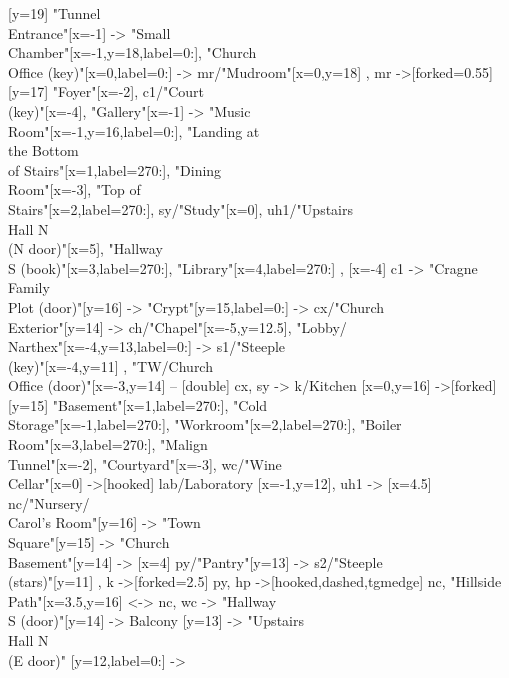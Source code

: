\documentclass[a5paper]{extarticle}
\begin{document}
\begin{adjustbox}{max size={\linewidth}{\dimexpr\textheight - 2.5em\relax},center}
\begin{gamemap}[>={Stealth[round,black]},set grid={8.5em}{5.5em}]
{  { [y=19] "Tunnel\\Entrance"[x=-1] -> "Small\\Chamber"[x=-1,y=18,label={0:\faBook}],
    "Church\\Office (key)"[x=0,label={0:\faUniversity}] -> mr/"Mudroom"[x=0,y=18] },
  mr ->[forked=0.55]
  { [y=17] "Foyer"[x=-2], c1/"Court\\(key)"[x=-4], "Gallery"[x=-1] -> "Music\\Room"[x=-1,y=16,label={0:\faUniversity}],
    "Landing at\\the Bottom\\of Stairs"[x=1,label={270:\faBook}], "Dining\\Room"[x=-3],
    "Top of\\Stairs"[x=2,label={270:\faBook}], sy/"Study"[x=0], uh1/"Upstairs\\Hall N\\(N door)"[x=5],
    "Hallway\\S (book)"[x=3,label={270:\faBook}],
    "Library"[x=4,label={270:\faBook}] },
  { [x=-4] c1 -> "Cragne Family\\Plot (door)"[y=16] -> "Crypt"[y=15,label={0:\faUniversity}] ->
    cx/"Church\\Exterior"[y=14]} ->
  { ch/"Chapel"[x=-5,y=12.5], "Lobby/\\Narthex"[x=-4,y=13,label={0:\faBook}] -> s1/"Steeple\\(key)"[x=-4,y=11] },
  "TW/Church\\Office (door)"[x=-3,y=14] -- [double] cx,
  sy -> k/Kitchen [x=0,y=16] ->[forked]
  { [y=15] "Basement"[x=1,label={270:\faBook}], "Cold\\Storage"[x=-1,label={270:\faUniversity}], "Workroom"[x=2,label={270:\faBook}], "Boiler\\Room"[x=3,label={270:\faBook}],
    "Malign\\Tunnel"[x=-2], "Courtyard"[x=-3], wc/"Wine\\Cellar"[x=0] ->[hooked] lab/Laboratory [x=-1,y=12]},
  uh1 ->
  { [x=4.5] nc/"Nursery/\\Carol's Room"[y=16] -> "Town\\Square"[y=15] -> "Church\\Basement"[y=14] } ->
  { [x=4] py/"Pantry"[y=13] -> s2/"Steeple\\(stars)"[y=11] },
  k ->[forked=2.5] py,
  hp ->[hooked,dashed,tgmedge] nc,
  "Hillside\\Path"[x=3.5,y=16] <-> nc,
  wc -> "Hallway\\S (door)"[y=14] ->  Balcony [y=13] -> "Upstairs\\Hall N\\(E door)" [y=12,label={0:\faUniversity}] ->
}
\end{gamemap}
\end{adjustbox}
\end{document}
